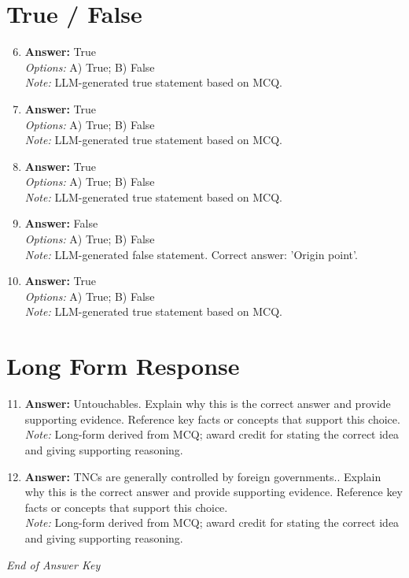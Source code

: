\documentclass[12pt]{article}
\begin{document}
\section*{True / False}
\begin{enumerate}[label=\arabic*.]
\setcounter{enumi}{5}
\item \textbf{Answer:} True
\\ \textit{Options:} A) True; B) False
\\ \textit{Note:} LLM-generated true statement based on MCQ.
\item \textbf{Answer:} True
\\ \textit{Options:} A) True; B) False
\\ \textit{Note:} LLM-generated true statement based on MCQ.
\item \textbf{Answer:} True
\\ \textit{Options:} A) True; B) False
\\ \textit{Note:} LLM-generated true statement based on MCQ.
\item \textbf{Answer:} False
\\ \textit{Options:} A) True; B) False
\\ \textit{Note:} LLM-generated false statement. Correct answer: 'Origin point'.
\item \textbf{Answer:} True
\\ \textit{Options:} A) True; B) False
\\ \textit{Note:} LLM-generated true statement based on MCQ.
\end{enumerate}

\section*{Long Form Response}
\begin{enumerate}[label=\arabic*.]
\setcounter{enumi}{10}
\item \textbf{Answer:} Untouchables. Explain why this is the correct answer and provide supporting evidence. Reference key facts or concepts that support this choice.
\\ \textit{Note:} Long-form derived from MCQ; award credit for stating the correct idea and giving supporting reasoning.
\item \textbf{Answer:} TNCs are generally controlled by foreign governments.. Explain why this is the correct answer and provide supporting evidence. Reference key facts or concepts that support this choice.
\\ \textit{Note:} Long-form derived from MCQ; award credit for stating the correct idea and giving supporting reasoning.
\end{enumerate}

\vfill
\noindent\textit{End of Answer Key}
\end{document}
